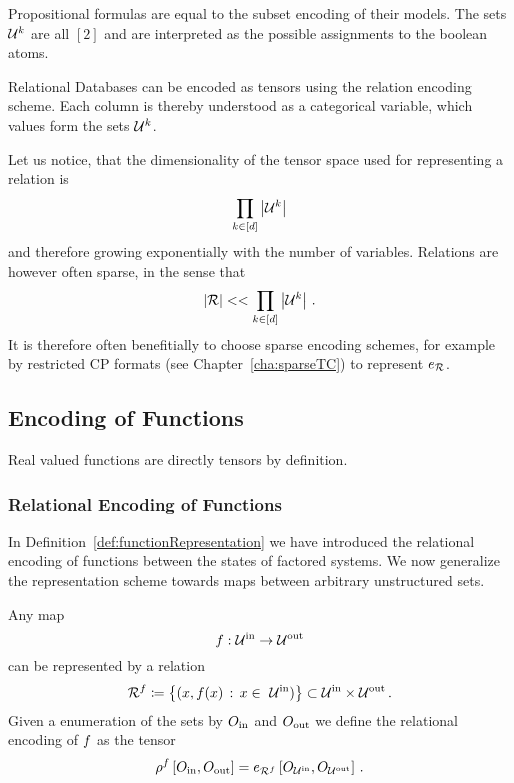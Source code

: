 \begin{example}
	Propositional formulas are equal to the subset encoding of their models.
	The sets $\mathcal{U}^{k}$ are all $[2]$ and are interpreted as the possible assignments to the boolean atoms.
\end{example}


\begin{example}
	Relational Databases can be encoded as tensors using the relation encoding scheme.
	Each column is thereby understood as a categorical variable, which values form the sets $\mathcal{U}^{k}$.
\end{example}

Let us notice, that the dimensionality of the tensor space used for representing a relation is 
	\[ \prod_{k\in[d]} \left|\mathcal{U}^{k}\right| \]
and therefore growing exponentially with the number of variables.
Relations are however often sparse, in the sense that 
	\[ \left|\mathcal{R}\right| << \prod_{k\in[d]} \left|\mathcal{U}^{k}\right| \, . \]
It is therefore often benefitially to choose sparse encoding schemes, for example by restricted CP formats (see Chapter~\ref{cha:sparseTC}) to represent $e_{\mathcal{R}}$.

\subsection{Encoding of Functions}

Real valued functions are directly tensors by definition.

\subsubsection{Relational Encoding of Functions}

In Definition~\ref{def:functionRepresentation} we have introduced the relational encoding of functions between the states of factored systems.
We now generalize the representation scheme towards maps between arbitrary unstructured sets.

\begin{definition}\label{def:functionRelationEncoding}
	Any map
		\[ f : \mathcal{U}^{\mathrm{in}} \rightarrow \mathcal{U}^{\mathrm{out}} \]
	can be represented by a relation
		\[ \exrelationof{\exfunction} \coloneqq \left\{ (x,\exfunction(x) \, : \, x \in \inset )\right\} \subset \inset \times \outset \, . \]
	Given a enumeration of the sets by $O_{\mathrm{in}}$ and $O_{\mathrm{out}}$ we define the relational encoding of $f$ as the tensor
		\[ \rho^{f}\left[O_{\mathrm{in}},O_{\mathrm{out}}\right] = e_{\mathcal{R}^{f}}\left[O_{\mathcal{U}^{\mathrm{in}}},O_{\mathcal{U}^{\mathrm{out}}}\right]  \, . \]
\end{definition}

